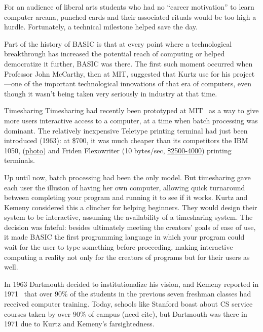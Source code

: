 \documentclass{article}
\begin{document}
For an audience of liberal arts students who had no ``career
motivation'' to learn computer arcana, punched cards and their associated
rituals would be too high a hurdle.
Fortunately, a technical milestone helped save the day.

Part of the history of BASIC is that at every point where a
technological breakthrough has increased the potential reach of
computing or helped democratize it further, BASIC was there.  The first
such moment occurred when
Professor John McCarthy, then at MIT, suggested that Kurtz use
  for his project---one of the important technological
innovations of that era of computers, even though it wasn't being taken
very seriously in industry at that time.

\begin{milestone}{Timesharing}
Timesharing had recently been prototyped at
MIT~\cite{corbato62timesharing} as a way to give more users interactive
access to a computer, at a time when
batch processing was dominant.
The relatively inexpensive Teletype
 printing terminal had just been introduced (1963): at \$700,
it was much cheaper than its competitors the IBM 1050, 
(\href{http://www.science.uva.nl/museum/ibm1050.php}{photo}) and
Friden Flexowriter (10 bytes/sec,
\href{http://retrotechnology.com/herbs_stuff/flex_behr.html}{\$2500-4000})
printing terminals.
\end{milestone}

Up until now, batch processing had been the only model.
But timesharing gave each user the illusion of having her own computer,
allowing quick turnaround between completing your program and running
it to see if it works.
Kurtz and Kemeny considered this a clincher for helping beginners.
They would design their system to be
interactive, assuming the availability of a timesharing system.  The
decision was fateful: besides ultimately meeting the creators' goals
of ease of use, it made BASIC the first programming language in which
your program could wait for the user to type something before
proceeding, making interactive computing a reality not only for the
creators of programs but for their users as well.

In 1963 Dartmouth decided to
institutionalize his vision, and Kemeny reported in
1971~\cite{man_and_computer} that
over 90\% of the students in the previous seven freshman classes had
received computer training.  Today, schools like Stanford boast about
CS service courses taken by over 90\% of campus (need cite), but
Dartmouth was there in 1971 due to Kurtz and Kemeny's farsightedness.
\end{document}
